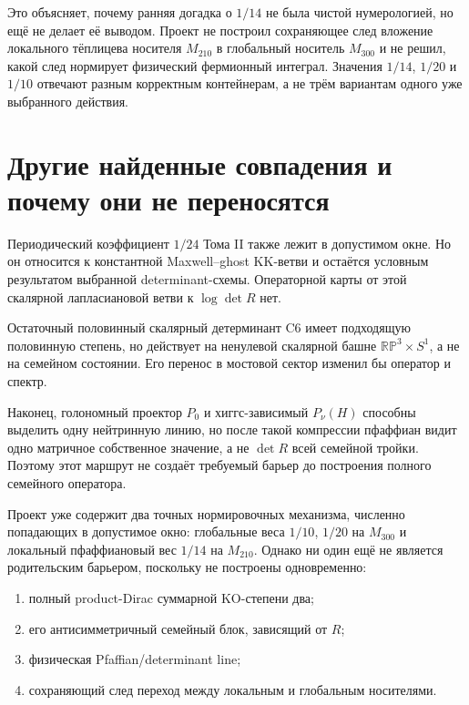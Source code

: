 Это объясняет, почему ранняя догадка о $1/14$ не была чистой нумерологией,
но ещё не делает её выводом. Проект не построил сохраняющее след вложение
локального тёплицева носителя $M_{210}$ в глобальный носитель $M_{300}$ и
не решил, какой след нормирует физический фермионный интеграл. Значения
$1/14$, $1/20$ и $1/10$ отвечают разным корректным контейнерам, а не трём
вариантам одного уже выбранного действия.

\section{Другие найденные совпадения и почему они не переносятся}

Периодический коэффициент $1/24$ Тома II также лежит в допустимом окне.
Но он относится к константной Maxwell--ghost KK-ветви и остаётся условным
результатом выбранной determinant-схемы. Операторной карты от этой
скалярной лапласиановой ветви к $\log\det R$ нет.

Остаточный половинный скалярный детерминант C6 имеет подходящую половинную
степень, но действует на ненулевой скалярной башне
$\mathbb{RP}^3\times S^1$, а не на семейном состоянии. Его перенос в
мостовой сектор изменил бы оператор и спектр.

Наконец, голономный проектор $P_0$ и хиггс-зависимый
$P_\nu(H)$ способны выделить одну нейтринную линию, но после такой
компрессии пфаффиан видит одно матричное собственное значение, а не
$\det R$ всей семейной тройки. Поэтому этот маршрут не создаёт требуемый
барьер до построения полного семейного оператора.

\begin{theorem}
Проект уже содержит два точных нормировочных механизма, численно попадающих
в допустимое окно: глобальные веса $1/10$, $1/20$ на $M_{300}$ и локальный
пфаффиановый вес $1/14$ на $M_{210}$. Однако ни один ещё не является
родительским барьером, поскольку не построены одновременно:
\begin{enumerate}
 \item полный product-Dirac суммарной KO-степени два;
 \item его антисимметричный семейный блок, зависящий от $R$;
 \item физическая Pfaffian/determinant line;
 \item сохраняющий след переход между локальным и глобальным носителями.
\end{enumerate}
\end{theorem}

